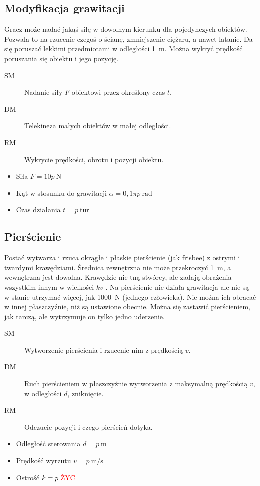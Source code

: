 \subsection{Modyfikacja grawitacji}
Gracz może nadać jakąś siłę w dowolnym kierunku dla pojedynczych obiektów.
Pozwala to na rzucenie czegoś o ścianę, zmniejszenie ciężaru, a nawet latanie.
Da się poruszać lekkimi przedmiotami w odległości \SI{1}{\metre}.
Można wykryć prędkość poruszania się obiektu i jego pozycję.
\begin{description}
	\item[SM] Nadanie siły $F$ obiektowi przez określony czas $t$.
	\item[DM] Telekineza małych obiektów w małej odległości.
	\item[RM] Wykrycie prędkości, obrotu i pozycji obiektu.
\end{description}
\begin{itemize}
	\item Siła $F = 10p \ \si{\newton}$
	\item Kąt w stosunku do grawitacji $\alpha = 0,1\pi p \ \si{\radian}$
	\item Czas działania $t = p \ \text{tur}$
\end{itemize}

\subsection{Pierścienie}
Postać wytwarza i rzuca okrągłe i płaskie pierścienie (jak frisbee) z ostrymi i twardymi krawędziami.
Średnica zewnętrzna nie może przekroczyć \SI{1}{\metre}, a wewnętrzna jest dowolna.
Krawędzie nie tną stwórcy, ale zadają obrażenia wszystkim innym w wielkości $kv$ \abzyc{}.
Na pierścienie nie działa grawitacja ale nie są w stanie utrzymać więcej, jak \SI{1000}{\newton} (jednego człowieka).
Nie można ich obracać w innej płaszczyźnie, niż są ustawione obecnie.
Można się zastawić pierścieniem, jak tarczą, ale wytrzymuje on tylko jedno uderzenie.
\begin{description}
	\item[SM] Wytworzenie pierścienia i rzucenie nim z prędkością $v$.
	\item[DM] Ruch pierścieniem w płaszczyźnie wytworzenia z maksymalną prędkością $v$, w odległości $d$, zniknięcie.
	\item[RM] Odczucie pozycji i czego pierścień dotyka.
\end{description}
\begin{itemize}
	\item Odległość sterowania $d = p \ \si{\metre}$
	\item Prędkość wyrzutu $v = p \ \si{\metre\per\second}$
	\item Ostrość $k = p \ \text{\abzyc{}}$
\end{itemize}

